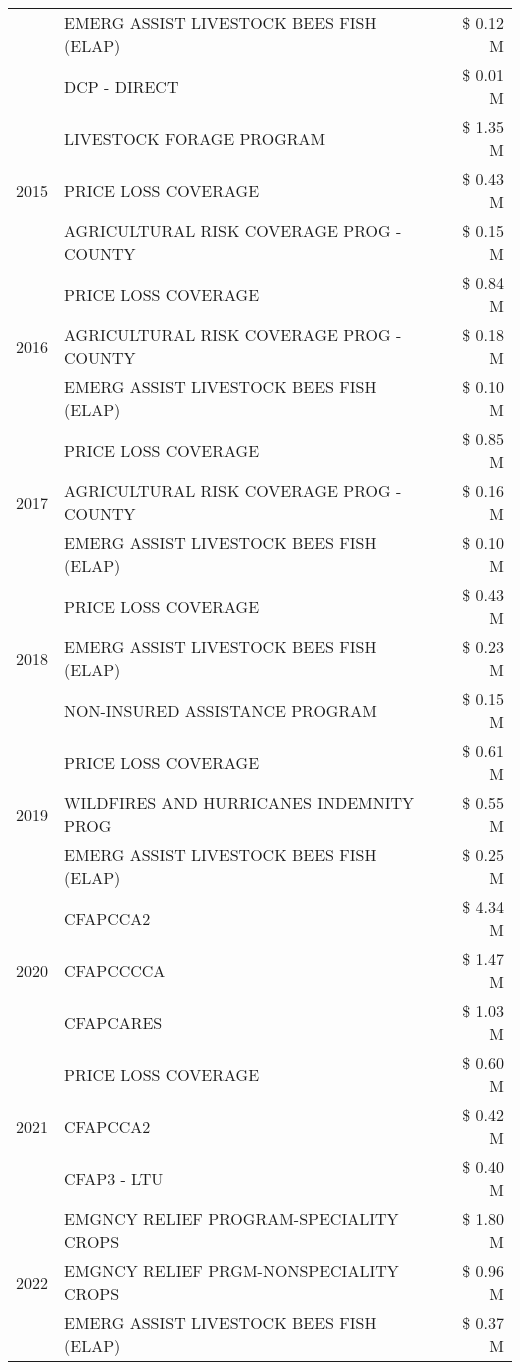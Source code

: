 \begin{tabular}{llr}
 & EMERG ASSIST LIVESTOCK BEES FISH (ELAP) & \$ 0.12 M \\
 & DCP - DIRECT & \$ 0.01 M \\
\cline{1-3}
\multirow[t]{3}{*}{2015} & LIVESTOCK FORAGE PROGRAM & \$ 1.35 M \\
 & PRICE LOSS COVERAGE & \$ 0.43 M \\
 & AGRICULTURAL RISK COVERAGE PROG - COUNTY & \$ 0.15 M \\
\cline{1-3}
\multirow[t]{3}{*}{2016} & PRICE LOSS COVERAGE & \$ 0.84 M \\
 & AGRICULTURAL RISK COVERAGE PROG - COUNTY & \$ 0.18 M \\
 & EMERG ASSIST LIVESTOCK BEES FISH (ELAP) & \$ 0.10 M \\
\cline{1-3}
\multirow[t]{3}{*}{2017} & PRICE LOSS COVERAGE & \$ 0.85 M \\
 & AGRICULTURAL RISK COVERAGE PROG - COUNTY & \$ 0.16 M \\
 & EMERG ASSIST LIVESTOCK BEES FISH (ELAP) & \$ 0.10 M \\
\cline{1-3}
\multirow[t]{3}{*}{2018} & PRICE LOSS COVERAGE & \$ 0.43 M \\
 & EMERG ASSIST LIVESTOCK BEES FISH (ELAP) & \$ 0.23 M \\
 & NON-INSURED ASSISTANCE PROGRAM & \$ 0.15 M \\
\cline{1-3}
\multirow[t]{3}{*}{2019} & PRICE LOSS COVERAGE & \$ 0.61 M \\
 & WILDFIRES AND HURRICANES INDEMNITY PROG & \$ 0.55 M \\
 & EMERG ASSIST LIVESTOCK BEES FISH (ELAP) & \$ 0.25 M \\
\cline{1-3}
\multirow[t]{3}{*}{2020} & CFAPCCA2 & \$ 4.34 M \\
 & CFAPCCCCA & \$ 1.47 M \\
 & CFAPCARES & \$ 1.03 M \\
\cline{1-3}
\multirow[t]{3}{*}{2021} & PRICE LOSS COVERAGE & \$ 0.60 M \\
 & CFAPCCA2 & \$ 0.42 M \\
 & CFAP3 - LTU & \$ 0.40 M \\
\cline{1-3}
\multirow[t]{3}{*}{2022} & EMGNCY RELIEF PROGRAM-SPECIALITY CROPS & \$ 1.80 M \\
 & EMGNCY RELIEF PRGM-NONSPECIALITY CROPS & \$ 0.96 M \\
 & EMERG ASSIST LIVESTOCK BEES FISH (ELAP) & \$ 0.37 M \\
\cline{1-3}
\bottomrule
\end{tabular}
